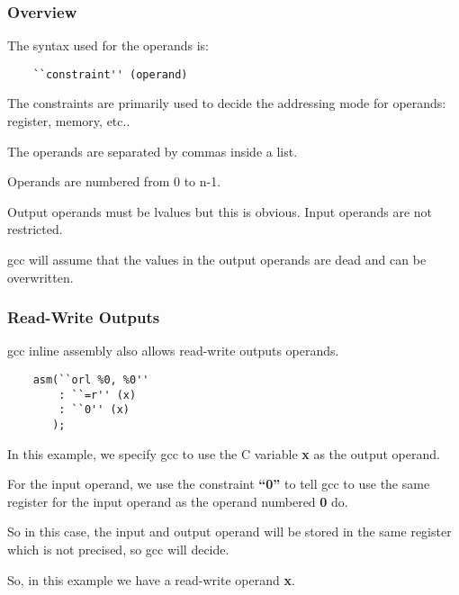 {%

\begin{frame}[containsverbatim]
  \frametitle{Overview}

  The syntax used for the operands is:

  \begin{verbatim}
    ``constraint'' (operand)
  \end{verbatim}

  The constraints are primarily used to decide the addressing mode for
  operands: register, memory, etc..

  \nl

  The operands are separated by commas inside a list.

  \nl

  Operands are numbered from 0 to n-1.

  \nl

  Output operands must be lvalues but this is obvious. Input operands
  are not restricted.

  \nl

  gcc will assume that the values in the output operands are dead
  and can be overwritten.
\end{frame}


\begin{frame}[containsverbatim]
  \frametitle{Read-Write Outputs}

  gcc inline assembly also allows read-write outputs operands.

  \begin{verbatim}
    asm(``orl %0, %0''
        : ``=r'' (x)
        : ``0'' (x)
       );
  \end{verbatim}

  In this example, we specify gcc to use the C variable \textbf{x}
  as the output operand.

  \nl

  For the input operand, we use the constraint \textbf{``0''} to
  tell gcc to use the same register for the input operand as the
  operand numbered \textbf{0} do.

  \nl

  So in this case, the input and output operand will be stored in the same
  register which is not precised, so gcc will decide.

  \nl

  So, in this example we have a read-write operand \textbf{x}.
\end{frame}

}
